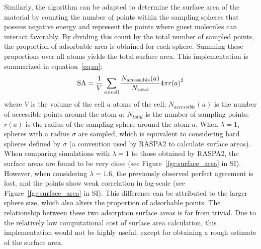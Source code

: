 \documentclass[main]{subfiles}
\begin{document}
Similarly, the algorithm can be adapted to determine the surface area of the material by counting the number of points within the sampling spheres that possess negative energy and represent the points where guest molecules can interact favorably. By dividing this count by the total number of sampled points, the proportion of adsorbable area is obtained for each sphere. Summing these proportions over all atoms yields the total surface area. This implementation is summarized in equation~\ref{eq:sa}:
\begin{equation}
\label{eq:sa}
    \textrm{SA} = \dfrac{1}{V}\sum_{a\in \textrm{cell}} \dfrac{N_{\text{accessible}}(a)}{N_{\text{total}}}4\pi {r(a)}^2
\end{equation}
where $V$ is the volume of the cell $a$ atoms of the cell; $N_{accessible}(a)$ is the number of accessible points around the atom $a$; $N_{total}$ is the number of sampling points; $r(a)$ is the radius of the sampling sphere around the atom $a$.
When $\lambda=1$, spheres with a radius $\sigma$ are sampled, which is equivalent to considering hard spheres defined by $\sigma$ (a convention used by RASPA2 to calculate surface areas). When comparing simulations with $\lambda=1$ to those obtained by RASPA2, the surface areas are found to be very close (see Figure~\ref{fgr:surface_area} in SI). However, when considering $\lambda=1.6$, the previously observed perfect agreement is lost, and the points show weak correlation in log-scale (see Figure~\ref{fgr:surface_area} in SI). This difference can be attributed to the larger sphere size, which also alters the proportion of adsorbable points. The relationship between these two adsorption surface areas is far from trivial. Due to the relatively low computational cost of surface area calculation, this implementation would not be highly useful, except for obtaining a rough estimate of the surface area.
\end{document}
